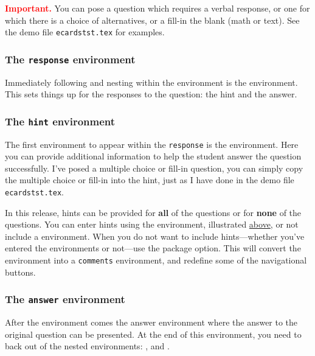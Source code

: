 \documentclass{article}
\begin{document}
\newtopic\noindent\textbf{\textcolor{red}{Important.}} You can pose a question which requires
a verbal response, or one for which there is a choice of
alternatives, or a fill-in the blank (math or text). See the demo
file \texttt{ecardstst.tex} for examples.

\subsubsection{The \texttt{response} environment}

Immediately following and nesting within the  environment is the
 environment.  This sets things up for the responses to the
question: the hint and the answer.

\subsubsection{The \texttt{hint} environment}\label{hint}

The first environment to appear within the \texttt{response} is
the  environment.  Here you can provide additional
information to help the student answer the question successfully.
I've posed a multiple choice or fill-in question, you can simply
copy the multiple choice or fill-in into the hint, just as I have done
in the demo file \texttt{ecardstst.tex}.

In this release, hints can be provided for \textbf{all} of the questions or
for \textbf{none} of the questions. You can enter hints using the 
environment, illustrated \hyperlink{cardsyntax}{above}, or not include a
 environment.  When you do not want to include hints---whether
you've entered the environments or not---use the  package
option. This will convert the  environment into a \texttt{comments}
environment, and redefine some of the navigational buttons.

\subsubsection{The \texttt{answer} environment}

After the  environment comes the answer environment where the answer to
the original question can be presented. At the end of this environment, you
need to back out of the nested environments: ,
 and .

\subsection{\texorpdfstring{\protect{}}{\textbackslash{end\{document\}}}}
\end{document}
